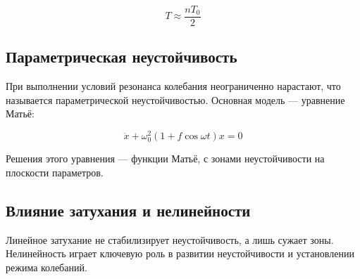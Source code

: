 \documentclass[10pt]{article}
\begin{document}
\begin{equation*}
T \approx \frac{n T_{0}}{2}
\end{equation*}

\subsection*{Параметрическая неустойчивость}
При выполнении условий резонанса колебания неограниченно нарастают, что называется параметрической неустойчивостью. Основная модель — уравнение Матьё:

\begin{equation*}
\ddot{x}+\omega_{0}^{2}(1+f \cos \omega t) x=0
\end{equation*}

Решения этого уравнения — функции Матьё, с зонами неустойчивости на плоскости параметров.

\subsection*{Влияние затухания и нелинейности}
Линейное затухание не стабилизирует неустойчивость, а лишь сужает зоны. Нелинейность играет ключевую роль в развитии неустойчивости и установлении режима колебаний.
\end{document}
